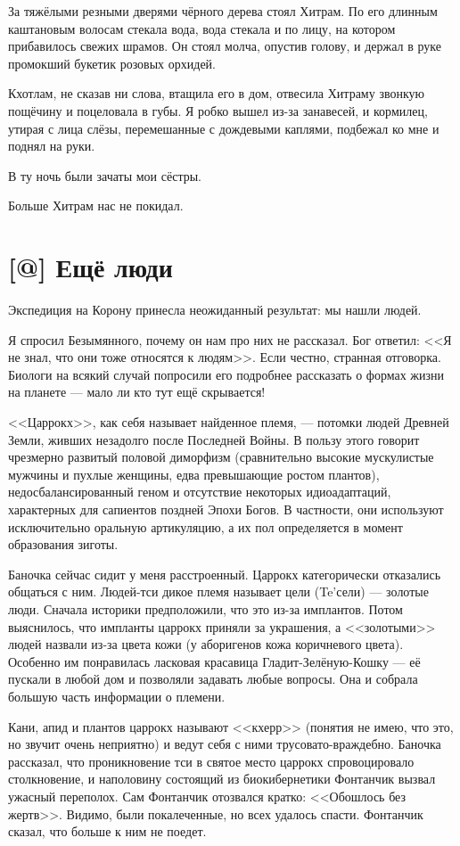 За тяжёлыми резными дверями чёрного дерева стоял Хитрам.
По его длинным каштановым волосам стекала вода, вода стекала и по лицу, на котором прибавилось свежих шрамов.
Он стоял молча, опустив голову, и держал в руке промокший букетик розовых орхидей.

Кхотлам, не сказав ни слова, втащила его в дом, отвесила Хитраму звонкую пощёчину и поцеловала в губы.
Я робко вышел из-за занавесей, и кормилец, утирая с лица слёзы, перемешанные с дождевыми каплями, подбежал ко мне и поднял на руки.

В ту ночь были зачаты мои сёстры.

Больше Хитрам нас не покидал.

\section{[@] Ещё люди}

Экспедиция на Корону принесла неожиданный результат: мы нашли людей.

Я спросил Безымянного, почему он нам про них не рассказал.
Бог ответил: <<Я не знал, что они тоже относятся к людям>>.
Если честно, странная отговорка.
Биологи на всякий случай попросили его подробнее рассказать о формах жизни на планете --- мало ли кто тут ещё скрывается!

<<Царрокх>>, как себя называет найденное племя, --- потомки людей Древней Земли, живших незадолго после Последней Войны.
В пользу этого говорит чрезмерно развитый половой диморфизм (сравнительно высокие мускулистые мужчины и пухлые женщины, едва превышающие ростом плантов), недосбалансированный геном и отсутствие некоторых идиоадаптаций, характерных для сапиентов поздней Эпохи Богов.
В частности, они используют исключительно оральную артикуляцию, а их пол определяется в момент образования зиготы.

Баночка сейчас сидит у меня расстроенный.
Царрокх категорически отказались общаться с ним.
Людей-тси дикое племя называет цели (Te'сели) --- золотые люди.
Сначала историки предположили, что это из-за имплантов.
Потом выяснилось, что импланты царрокх приняли за украшения, а <<золотыми>> людей назвали из-за цвета кожи (у аборигенов кожа коричневого цвета).
Особенно им понравилась ласковая красавица Гладит-Зелёную-Кошку --- её пускали в любой дом и позволяли задавать любые вопросы.
Она и собрала большую часть информации о племени.

Кани, апид и плантов царрокх называют <<кхерр>> (понятия не имею, что это, но звучит очень неприятно) и ведут себя с ними трусовато-враждебно.
Баночка рассказал, что проникновение тси в святое место царрокх спровоцировало столкновение, и наполовину состоящий из биокибернетики Фонтанчик вызвал ужасный переполох.
Сам Фонтанчик отозвался кратко: <<Обошлось без жертв>>.
Видимо, были покалеченные, но всех удалось спасти.
Фонтанчик сказал, что больше к ним не поедет.

